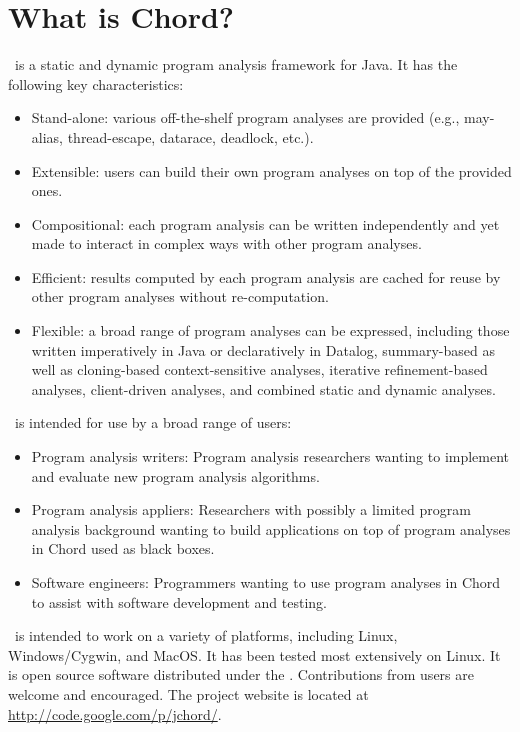 \section{What is Chord?}
\label{sec:whatis-chord}

\Chord\ is a static and dynamic program analysis framework for Java.
It has the following key characteristics:

\begin{itemize}
\item
Stand-alone: various off-the-shelf program analyses are provided (e.g., may-alias, thread-escape, datarace, deadlock, etc.).
\item
Extensible: users can build their own program analyses on top of the provided ones.
\item
Compositional: each program analysis can be written independently and yet made to interact in complex ways with other program analyses.
\item
Efficient: results computed by each program analysis are cached for reuse by other program analyses without re-computation.
\item
Flexible: a broad range of program analyses can be expressed, including those
written imperatively in Java or declaratively in Datalog, summary-based as well as cloning-based context-sensitive analyses,
iterative refinement-based analyses, client-driven analyses, and combined static and dynamic analyses.
\end{itemize}

\noindent \Chord\ is intended for use by a broad range of users:

\begin{itemize}
\item
Program analysis writers: Program analysis researchers wanting to implement and evaluate new program analysis algorithms.
\item
Program analysis appliers: Researchers with possibly a limited program analysis background wanting to build applications on
top of program analyses in Chord used as black boxes.
\item
Software engineers: Programmers wanting to use program analyses in Chord to assist with software development and testing.
\end{itemize}

\noindent \Chord\ is intended to work on a variety of platforms, including Linux, Windows/Cygwin, and MacOS.
It has been tested most extensively on Linux.
It is open source software distributed under the .
Contributions from users are welcome and encouraged.
The project website is located at \url{http://code.google.com/p/jchord/}.

